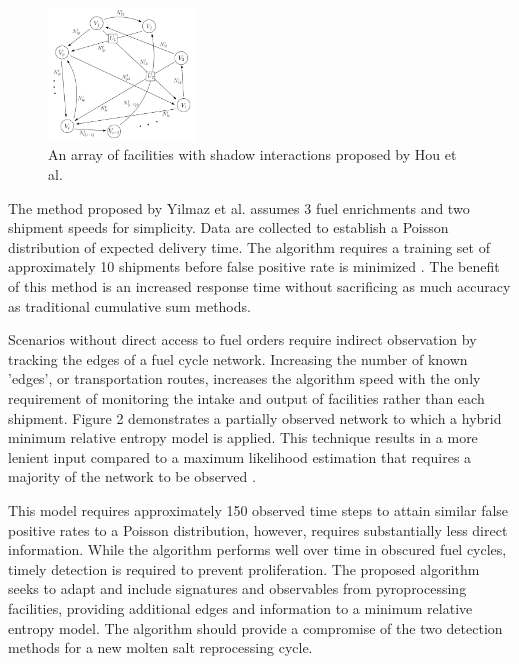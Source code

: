\documentclass{anstrans}
\begin{document}
\begin{figure}[ht] %
	\centering
	\includegraphics[width=0.35\textwidth]{Hou_Network}
	\caption{An array of facilities with shadow interactions proposed by Hou et al\cite{Hou_2016}.}
	\label{fig:maximumlikelihood}
\end{figure}

The method proposed by Yilmaz et al. assumes 3 fuel enrichments and two shipment speeds for simplicity. Data are collected to establish a Poisson distribution of expected delivery time. The algorithm requires a training set of approximately 10 shipments before false positive rate is minimized \cite{Yilmaz_2016}. The benefit of this method is an increased response time without sacrificing as much accuracy as traditional cumulative sum methods. 

Scenarios without direct access to fuel orders require indirect observation by tracking the edges of a fuel cycle network. Increasing the number of known 'edges', or transportation routes, increases the algorithm speed with the only requirement of monitoring the intake and output of facilities rather than each shipment. Figure 2 demonstrates a partially observed network to which a hybrid minimum relative entropy model is applied. This technique results in a more lenient input compared to a maximum likelihood estimation that requires a majority of the network to be observed \cite{Hou_2016}.


This model requires approximately 150 observed time steps to attain similar false positive rates to a Poisson distribution, however, requires substantially less direct information. While the algorithm performs well over time in obscured fuel cycles, timely detection is required to prevent proliferation. The proposed algorithm seeks to adapt and include signatures and observables from pyroprocessing facilities, providing additional edges and information to a minimum relative entropy model. The algorithm should provide a compromise of the two detection methods for a new molten salt reprocessing cycle.
\end{document}
